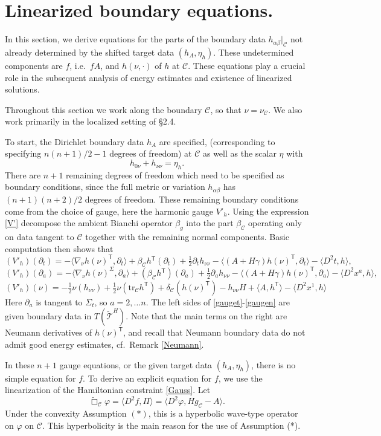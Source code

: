 \documentclass[10pt]{amsart}
\renewcommand{\a}{\alpha}
\renewcommand{\b}{\beta}
\newcommand{\g}{\gamma}
\renewcommand{\d}{\delta}
\newcommand{\f}{\varphi}
\newcommand{\Si}{\Sigma}
\newcommand{\cC}{{\mathcal C}}
\newcommand{\cT}{{\mathcal T}}
\newcommand{\tT}{\mathsf{T}}
\newcommand{\be}{\begin{equation}}
\newcommand{\ee}{\end{equation}}
\newcommand{\tr}{\mathrm{tr}}
\newcommand{\p}{\partial}
\newcommand{\<}{\langle}
\renewcommand{\>}{\rangle}
\newcommand{\w}{\widetilde}
\theoremstyle{plain}
\theoremstyle{remark}
\theoremstyle{definition}
\numberwithin{equation}{section}
\begin{document}
 
 
 \section{Linearized boundary equations.}
  
    In this section, we derive equations for the parts of the boundary data $h_{\a\b}|_{\cC}$ not already 
determined by the shifted target data $(h_A, \eta_h)$. These undetermined components are $f$, i.e.~$fA$, and $h(\nu, \cdot)$ of $h$ at $\cC$. 
These equations play a crucial role in the subsequent analysis of energy estimates and existence of linearized solutions. 

  Throughout this section we work along the boundary $\cC$, so that $\nu = \nu_{\cC}$. We also work primarily in the localized setting of \S 2.4. 

  To start, the Dirichlet boundary data $h_A$ are specified, (corresponding to specifying $n(n+1)/2 - 1$ degrees of freedom) at $\cC$ as well as 
the scalar $\eta$ with 
\be \label{eta'}
h_{0\nu} + h_{\nu \nu} = \eta_h.
\ee
There are $n+1$ remaining degrees of freedom which need to be specified as boundary conditions, since the full metric or variation $h_{\a\b}$ has 
$(n+1)(n+2)/2$ degrees of freedom. These remaining boundary conditions come from the choice of gauge, here the harmonic gauge $V'_h$. Using 
the expression \eqref{V'}  decompose the ambient Bianchi operator $\b_g$ into the part $\b_{\cC}$ operating only on data tangent to $\cC$ together with the remaining 
normal components. Basic computation then shows that  
\be \label{gauget}
(V'_h)(\p_t) = - \<\nabla_{\nu}h(\nu)^{\tT}, \p_t\> + \b_{\cC}h{^\tT}(\p_t) + \tfrac{1}{2}\p_t h_{\nu \nu} - \<(A + H\g)h(\nu)^{\tT}, \p_t\> - \<D^2t, h\>,
\ee
\be \label{gaugeSi}
(V'_h)(\p_a) = - \<\nabla_{\nu}h(\nu)^{\Si}, \p_a\> + (\b_{\cC}h{^\tT})(\p_a) + \tfrac{1}{2}\p_a h_{\nu \nu} - \<(A + H\g)h(\nu)^{\tT}, \p_a\> 
- \<D^2 x^a, h\>,
\ee 
\be \label{gaugen}
(V'_h)(\nu) = -\tfrac{1}{2}\nu(h_{\nu \nu}) + \tfrac{1}{2}\nu(\tr_{\cC}h^{\tT}) + \d_{\cC}(h(\nu)^{\tT}) - h_{\nu \nu}H + \<A, h^{\tT}\> - \<D^2 x^1, h\>
\ee 
Here $\p_a$ is tangent to $\Si_t$, so $a = 2, \dots n$. The left sides of \eqref{gauget}-\eqref{gaugen} are given boundary data in $T(\w \cT^H)$. 
Note that the main terms on the right are Neumann derivatives of $h(\nu)^{\tT}$, and recall that Neumann boundary data do not admit good 
energy estimates, cf.~Remark \ref{Neumann}. 

   In these $n+1$ gauge equations, or the given target data $(h_A, \eta_h)$, there is no simple equation for $f$. To derive an explicit equation for 
$f$, we use the linearization of the Hamiltonian constraint \eqref{Gauss}. Let 
 $$\w \Box_{\cC} \f = \<D^2f, \Pi\> = \<D^2 \f, Hg_{\cC} - A\>.$$
 Under the convexity Assumption $(*)$, this is a hyperbolic wave-type operator on $\f$ on $\cC$. This hyperbolicity is the main reason for 
 the use of Assumption (*). 
 
\end{document}

